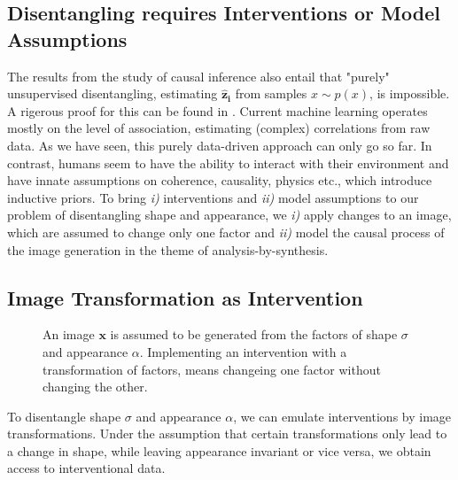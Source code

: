 	\subsection{Disentangling requires Interventions or Model Assumptions}\label{sec:requirements}
		The results from the study of causal inference also entail that "purely" unsupervised disentangling, \ie estimating $\mathbf{\hat z_i}$ from samples $x \sim p(x)$, is impossible. A rigerous proof for this can be found in \cite{locatello18challenging}.
		Current machine learning operates mostly on the level of association, estimating (complex) correlations from raw data.
		As we have seen, this purely data-driven approach can only go so far.
		In contrast, humans seem to have the ability to interact with their environment and have innate assumptions on coherence, causality, physics etc., which introduce inductive priors.
		To bring \emph{i)} interventions and \emph{ii)} model assumptions to our problem of disentangling shape and appearance, we \emph{i)} apply changes to an image, which are assumed to change only one factor and \emph{ii)} model the causal process of the image generation in the theme of analysis-by-synthesis.
%
%
%

	\subsection{Image Transformation as Intervention}\label{sec:transform}
		\begin{figure}[htp]
			\centering
			
			\caption{An image $\mathbf{x}$ is assumed to be generated from the factors of shape $\sigma$ and appearance $\alpha$. Implementing an intervention with a transformation of factors, means changeing one factor without changing the other.}
			\caption{}
			\label{fig:intervene}
		\end{figure}
		To disentangle shape $\sigma$ and appearance $\alpha$, we can emulate interventions by image transformations. Under the assumption that certain transformations only lead to a change in shape, while leaving appearance invariant or vice versa, we obtain access to interventional data. %

